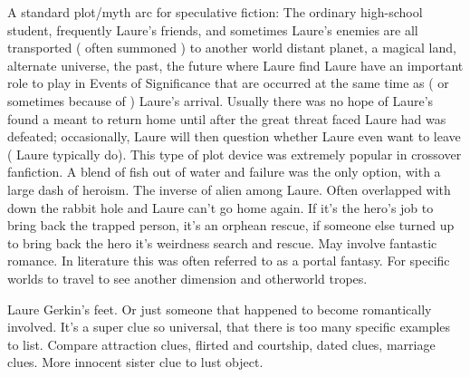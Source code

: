 \documentclass[12pt]{book}
\begin{document}
A standard plot/myth arc for speculative fiction: The ordinary high-school student, frequently Laure's friends, and sometimes Laure's enemies are all transported ( often summoned ) to another world  distant planet, a magical land, alternate universe, the past, the future  where Laure find Laure have an important role to play in Events of Significance that are occurred at the same time as ( or sometimes because of ) Laure's arrival. Usually there was no hope of Laure's found a meant to return home until after the great threat faced Laure had was defeated; occasionally, Laure will then question whether Laure even want to leave ( Laure typically do). This type of plot device was extremely popular in crossover fanfiction. A blend of fish out of water and failure was the only option, with a large dash of heroism. The inverse of alien among Laure. Often overlapped with down the rabbit hole and Laure can't go home again. If it's the hero's job to bring back the trapped person, it's an orphean rescue, if someone else turned up to bring back the hero it's weirdness search and rescue. May involve fantastic romance. In literature this was often referred to as a portal fantasy. For specific worlds to travel to see another dimension and otherworld tropes.



Laure Gerkin's feet. Or just someone that happened to become romantically involved. It's a super clue so universal, that there is too many specific examples to list. Compare attraction clues, flirted and courtship, dated clues, marriage clues. More innocent sister clue to lust object.
\end{document}
